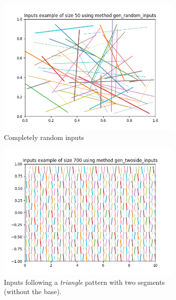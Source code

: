 \documentclass[letterpaper]{article}
\begin{document}
\begin{figure}[H]
    \begin{subfigure}{.5\textwidth}
      \centering
      \includegraphics[width=1\linewidth]{images/assign1/gen_inputs_random}
      \caption{Completely random inputs}
      \label{fig:random_inputs}
    \end{subfigure}
    \begin{subfigure}{.5\textwidth}
      \centering
      \includegraphics[width=1\linewidth]{images/assign1/gen_inputs_triangle}
      \caption{Inputs following a \textit{triangle} pattern with two segments (without the base).}
      \label{fig:triangle_inputs}
    \end{subfigure}
    \begin{subfigure}{.5\textwidth}

\end{subfigure}
\end{figure}
\end{document}
